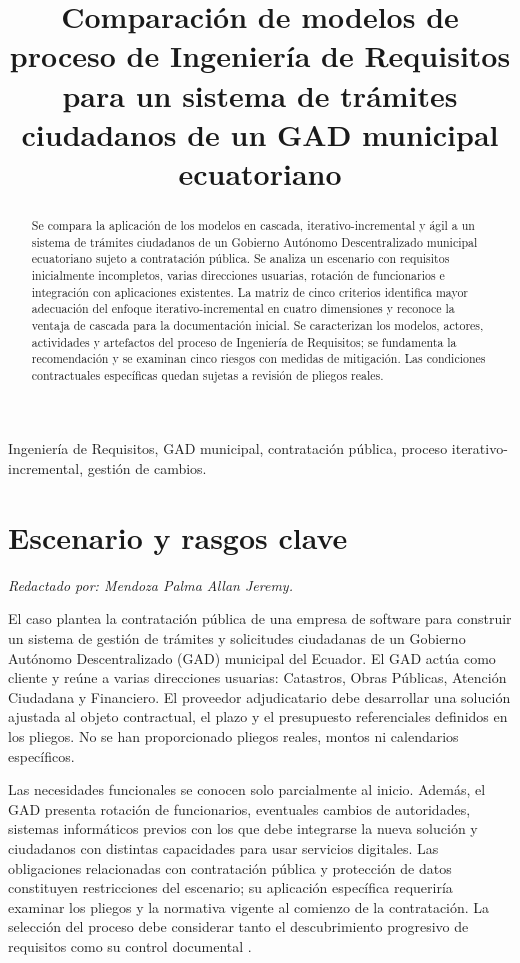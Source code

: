 \documentclass[conference,onecolumn]{IEEEtran}
\title{Comparación de modelos de proceso de Ingeniería de Requisitos\\
para un sistema de trámites ciudadanos de un GAD municipal ecuatoriano}
\author{
\IEEEauthorblockN{Mendoza Palma Allan Jeremy, Rochina Rochina Freddy David y Sánchez Centeno Roselyn Andreina}
\IEEEauthorblockA{Carrera de Ingeniería de Software\\
Universidad Técnica Estatal de Quevedo, Ecuador\\
Ingeniería de Requisitos (ISR-401) --- PC1 / GA-PRAC-01}
}
\begin{document}
\maketitle

\begin{abstract}
Se compara la aplicación de los modelos en cascada, iterativo-incremental y ágil a un sistema de trámites ciudadanos de un Gobierno Autónomo Descentralizado municipal ecuatoriano sujeto a contratación pública. Se analiza un escenario con requisitos inicialmente incompletos, varias direcciones usuarias, rotación de funcionarios e integración con aplicaciones existentes. La matriz de cinco criterios identifica mayor adecuación del enfoque iterativo-incremental en cuatro dimensiones y reconoce la ventaja de cascada para la documentación inicial. Se caracterizan los modelos, actores, actividades y artefactos del proceso de Ingeniería de Requisitos; se fundamenta la recomendación y se examinan cinco riesgos con medidas de mitigación. Las condiciones contractuales específicas quedan sujetas a revisión de pliegos reales.
\end{abstract}

\begin{IEEEkeywords}
Ingeniería de Requisitos, GAD municipal, contratación pública, proceso iterativo-incremental, gestión de cambios.
\end{IEEEkeywords}

\section{Escenario y rasgos clave}
\noindent\textit{Redactado por: Mendoza Palma Allan Jeremy.}\par\smallskip

El caso plantea la contratación pública de una empresa de software para construir un sistema de gestión de trámites y solicitudes ciudadanas de un Gobierno Autónomo Descentralizado (GAD) municipal del Ecuador. El GAD actúa como cliente y reúne a varias direcciones usuarias: Catastros, Obras Públicas, Atención Ciudadana y Financiero. El proveedor adjudicatario debe desarrollar una solución ajustada al objeto contractual, el plazo y el presupuesto referenciales definidos en los pliegos. No se han proporcionado pliegos reales, montos ni calendarios específicos.

Las necesidades funcionales se conocen solo parcialmente al inicio. Además, el GAD presenta rotación de funcionarios, eventuales cambios de autoridades, sistemas informáticos previos con los que debe integrarse la nueva solución y ciudadanos con distintas capacidades para usar servicios digitales. Las obligaciones relacionadas con contratación pública y protección de datos constituyen restricciones del escenario; su aplicación específica requeriría examinar los pliegos y la normativa vigente al comienzo de la contratación. La selección del proceso debe considerar tanto el descubrimiento progresivo de requisitos como su control documental \cite{pohl2025,washizaki2024,buhne2026}.
\end{document}
